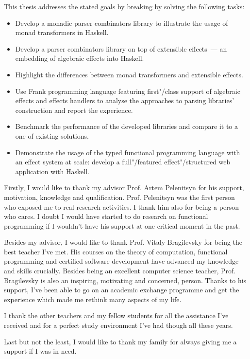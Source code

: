 This thesis addresses the stated goals by breaking by solving the following tasks:

\begin{itemize}
  \item Develop a monadic parser combinators library to illustrate the usage of
  monad transformers in Haskell.
  \item Develop a parser combinators library on top of extensible effects~--- an embedding of
  algebraic effects into Haskell.
  \item Highlight the differences between monad transformers and extensible effects.
  \item Use Frank programming language
  featuring first"/class support of algebraic effects and effects handlers to
  analyse the approaches to parsing libraries' construction and report the experience.
  \item Benchmark the performance of the developed libraries and compare it to
  a one of existing solutions.
  \item Demonstrate the usage of the typed functional programming language with an
  effect system at scale: develop a full"/featured effect"/structured web application
  with Haskell.
\end{itemize}

\Ackns

Firstly, I would like to thank my advisor Prof. Artem Pelenitsyn for his support, motivation,
knowledge and qualification. Prof. Pelenitsyn was the first person who exposed me to real
research activities. I thank him also for being a person who cares. I doubt I would have started
to do research on functional programming if I wouldn't have his support at one critical moment
in the past.

Besides my advisor, I would like to thank Prof. Vitaly Bragilevsky for being the best teacher
I've met. His courses on the theory of computation, functional programming and certified
software development have advanced my knowledge and skills crucially. Besides being an excellent
computer science teacher, Prof. Bragilevsky is also an inspiring, motivating and concerned,
person. Thanks to his support, I've been able to go on an academic exchange programme and get
the experience which made me rethink many aspects of my life.

I thank the other teachers and my fellow students for all the assistance I've received and for a
perfect study environment I've had though all these years.

Last but not the least, I would like to thank my family for always giving me a support if I was
in need.